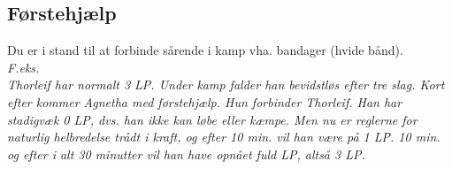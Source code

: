 \subsection*{Førstehjælp}
Du er i stand til at forbinde sårende i kamp vha. bandager (hvide bånd).\\
\textit{F.eks.\\
Thorleif har normalt 3 LP. Under kamp falder han bevidstløs efter tre slag. Kort efter kommer Agnetha med førstehjælp. Hun forbinder Thorleif. Han har stadigvæk 0 LP, dvs. han ikke kan løbe eller kæmpe. Men nu er reglerne for naturlig helbredelse trådt i kraft, og efter 10 min. vil han være på 1 LP. 10 min. og efter i alt 30 minutter vil han have opnået fuld LP, altså 3 LP.}\\
